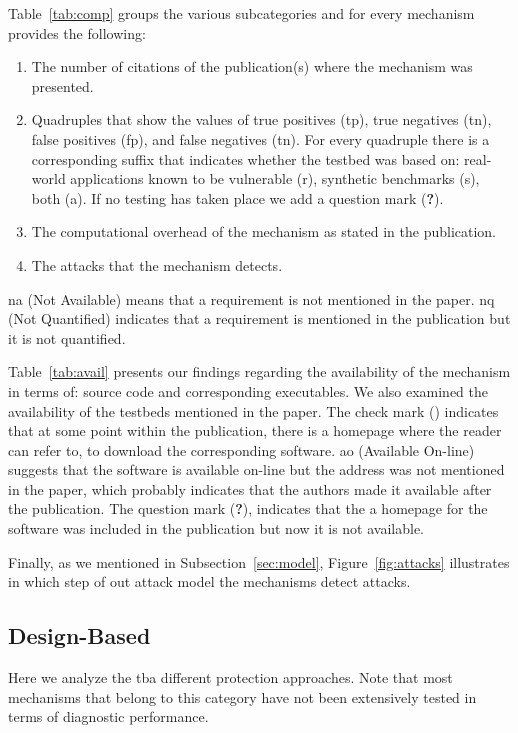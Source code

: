 \documentclass[conference]{IEEEtran}
\newcommand{\tick}{\ding{52}}
\begin{document}
Table~\ref{tab:comp} groups the various subcategories
and for every mechanism provides the following:

\begin{enumerate}
\item The number of citations of the publication(s) where
the mechanism was presented.
\item Quadruples that show the values of true
positives ({\sc tp}), true negatives ({\sc tn}),
false positives ({\sc fp}), and false negatives
({\sc tn}). For every quadruple there is a corresponding
suffix that indicates whether the testbed was based
on: real-world applications known to be vulnerable
(r), synthetic benchmarks (s), both (a).
If no testing has taken place we add a question
mark ({\bf ?}).
\item The computational overhead of the
mechanism as stated in the publication.
\item The attacks that the mechanism detects.
\end{enumerate}

\noindent
{\sc na} (Not Available) means that a requirement is not
mentioned in the paper. {\sc nq} (Not Quantified)
indicates that a requirement is mentioned in the publication
but it is not quantified.

Table~\ref{tab:avail} presents
our findings regarding the availability of the mechanism
in terms of: source code and corresponding executables.
We also examined the availability of the testbeds mentioned in the paper.
The check mark (\tick) indicates that at some point within the publication,
there is a homepage where the reader can refer to, to download the
corresponding software. {\sc ao} (Available On-line) suggests that
the software is available on-line but the address was not mentioned
in the paper, which probably indicates that the authors made
it available after the publication. The question mark ({\bf ?}),
indicates that the a homepage for the software was included
in the publication but now it is not available.

Finally, as we mentioned in Subsection~\ref{sec:model},
Figure~\ref{fig:attacks} illustrates in which step
of out attack model the mechanisms detect attacks.

\subsection{Design-Based}
\label{sec:prot}

Here we analyze the {\sc tba} different protection approaches.
Note that most mechanisms that belong to this category have
not been extensively tested in terms of diagnostic performance.
\end{document}
